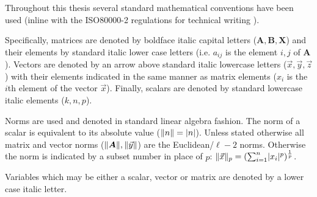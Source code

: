 Throughout this thesis several standard mathematical conventions have been used 
(inline with the ISO80000-2 regulations for technical writing \citet{ISO2009}).

Specifically, matrices are denoted by boldface italic capital letters 
(\(\bm{A}, \bm{B}, \bm{X}\)) 
and their elements by standard italic lower case letters 
(i.e. \(a_{ij}\) is the element \(i,j\) of \(\bm{A}\)). 
Vectors are denoted by an arrow above standard italic lowercase letters 
(\(\vec{x}, \vec{y}, \vec{z}\)) with their elements 
indicated in the same manner as matrix elements (\(x_{i}\) is the 
\(i\)th element of the vector \(\vec{x}\)).
Finally, scalars are denoted by standard lowercase italic elements (\(k, n, p\)).

Norms are used and denoted in standard linear algebra fashion. 
The norm of a scalar is equivalent to its absolute value (\(\lVert n\rVert = \lvert n\rvert\)).
Unless stated otherwise all matrix and vector norms 
(\(\lVert\bm{A}\rVert, \lVert\vec{y}\rVert\)) are the Euclidean/\(\ell-2\) norms.
Otherwise the norm is indicated by a subset number in place of \(p\):
\(\lVert\vec{x}\rVert_{p} = (\sum^{n}_{i=1} \lvert x_{i}\rvert^{p})^{\frac{1}{p}}\).

Variables which may be either a scalar, vector or matrix are denoted by a lower case italic letter.

